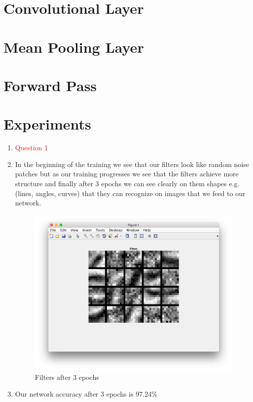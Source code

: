 \documentclass{article}
\begin{document}
\section{Convolutional Layer}

\section{Mean Pooling Layer}

\section{Forward Pass}

\section{Experiments}
\begin{enumerate}
\item \textcolor{red}{Question 1}
\item In the beginning of the training we see that our filters look like random noise patches but as our training progresses we see that the filters achieve more structure and finally after 3 epochs we can see clearly on them shapes e.g.(lines, angles, curves) that they can recognize on images that we feed to our network.
\begin{figure}[!h]
    \centering
    \includegraphics[width=1\textwidth]{filters.png}
    \caption{Filters after 3 epochs}
    \label{fig:picture}
  \end{figure}
\item Our network accuracy after 3 epochs is 97.24\%
\end{enumerate}
\end{document}
